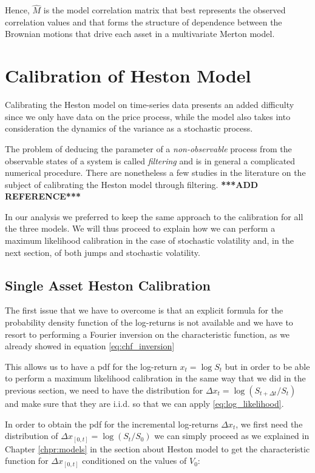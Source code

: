 Hence, $\widehat{M}$ is the model correlation matrix that best represents the observed correlation values and that forms the structure of dependence between the Brownian motions that drive each asset in a multivariate Merton model.


\bigskip
\section{Calibration of Heston Model}
\label{sec:heston_cal}
Calibrating the Heston model on time-series data presents an added difficulty since we only have data on the price process, while the model also takes into consideration the dynamics of the variance as a stochastic process. 

The problem of deducing the parameter of a \textit{non-observable} process from the observable states of a system is called \textit{filtering} and is in general a complicated numerical procedure. There are nonetheless a few studies in the literature on the subject of calibrating the Heston model through filtering. \textbf{***ADD REFERENCE***}

In our analysis we preferred to keep the same approach to the calibration for all the three models. We will thus proceed to explain how we can perform a maximum likelihood calibration in the case of stochastic volatility and, in the next section, of both jumps and stochastic volatility.

\subsection{Single Asset Heston Calibration}
The first issue that we have to overcome is that an explicit formula for the probability density function of the log-returns is not available and we have to resort to performing a Fourier inversion on the characteristic function, as we already showed in equation \eqref{eq:chf_inversion}

This allows us to have a pdf for the log-return $x_t = \log S_t $ but in order to be able to perform a maximum likelihood calibration in the same way that we did in the  previous section, we need to have the distribution for $\Delta x_t = \log (S_{t + \Delta t} / S_t)$ and make sure that they are i.i.d. so that we can apply \eqref{eq:log_likelihood}.

In order to obtain the pdf for the incremental log-returns $\Delta x_t$, we first need the distribution of  $\Delta x_{[0, t] }= \log (S_t / S_0)$ we can simply proceed as we explained in Chapter \ref{chpr:models} in the section about Heston model to get the characteristic function for $\Delta x_{[0, t] }$ conditioned on the values of $V_0$: 

